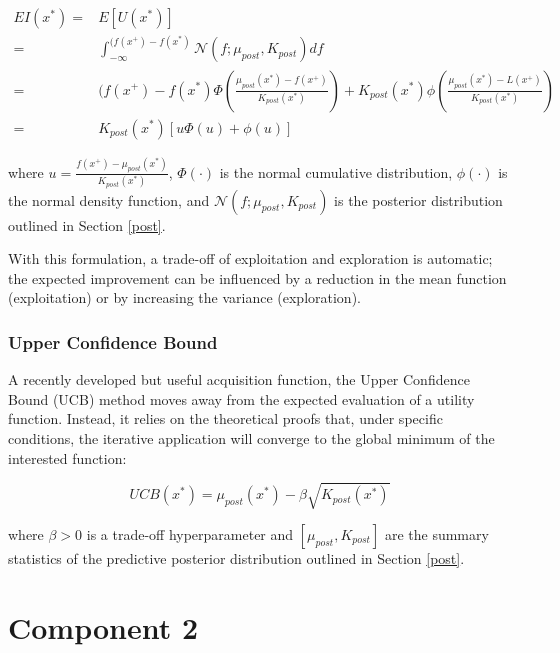 \begin{equation}
\begin{split}
EI(x^\ast) = & E[U(x^\ast)] \\
= & \int_{-\infty}^{(f(x^+)-f(x^\ast)} \mathcal{N}\left(f;\mu_{post},K_{post}\right) df\\
= & (f(x^+)-f(x^\ast)\Phi \left(\frac{\mu_{post}(x^\ast) - f(x^+)}{K_{post}(x^\ast)}\right) + K_{post}(x^\ast)\phi \left(\frac{\mu_{post}(x^\ast) - L(x^+)}{K_{post}(x^\ast)}\right) \\
= & K_{post}(x^\ast) [u\Phi(u) + \phi(u)]
\end{split}
\end{equation}

where $u = \frac{f(x^+)-\mu_{post}(x^\ast)}{K_{post}(x^\ast)}$, $\Phi(\cdot)$ is the normal cumulative distribution, $\phi(\cdot)$ is the normal density function, and $\mathcal{N}\left(f;\mu_{post},K_{post}\right)$ is the posterior distribution outlined in Section \ref{post}.

With this formulation, a trade-off of exploitation and exploration is automatic; the expected improvement can be influenced by a reduction in the mean function (exploitation) or by increasing the variance (exploration).

\subsubsection{Upper Confidence Bound}
A recently developed but useful acquisition function, the Upper Confidence Bound (UCB) method moves away from the expected evaluation of a utility function. Instead, it relies on the theoretical proofs that, under specific conditions, the iterative application will converge to the global minimum of the interested function:

\begin{equation}
UCB(x^\ast) = \mu_{post}(x^\ast) - \beta \sqrt{K_{post}(x^\ast)}
\end{equation}

where $\beta > 0$ is a trade-off hyperparameter and $[\mu_{post},K_{post}]$ are the summary statistics of the predictive posterior distribution outlined in Section \ref{post}.

\section{Component 2}
